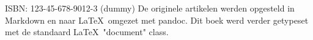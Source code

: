 \mbox{}
\vfill
ISBN: 123-45-678-9012-3 (dummy)
De originele artikelen werden opgesteld in Markdown
en naar \LaTeX\ omgezet met pandoc.
Dit boek werd verder getypeset met de standaard \LaTeX\ "document" class.
\doclicenseThis
